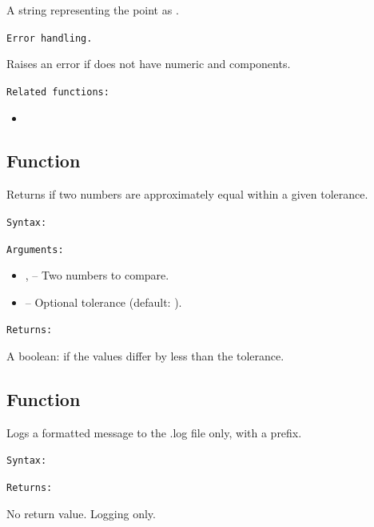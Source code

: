 A string representing the point as .

\medskip
\texttt{Error handling.}

Raises an error if  does not have numeric  and  components.

\medskip
\texttt{Related functions: }

\begin{itemize}
\item {}
\end{itemize}

\subsection{Function }
\label{sub:function_utils_almost_equal}

Returns  if two numbers are approximately equal within a given tolerance.

\medskip
\texttt{Syntax: }

\begin{center}
\end{center}

\medskip
\texttt{Arguments: }

\begin{itemize}
\item {},  – Two numbers to compare.
\item {} – Optional tolerance (default: ).
\end{itemize}

\medskip
\texttt{Returns: }

A boolean:  if the values differ by less than the tolerance.



\subsection{Function }
\label{sub:function_utils_wlog}

Logs a formatted message to the .log file only, with a  prefix.

\medskip
\texttt{Syntax: }

\begin{center}
\end{center}

\medskip
\texttt{Returns: }

No return value. Logging only.
\endinput
